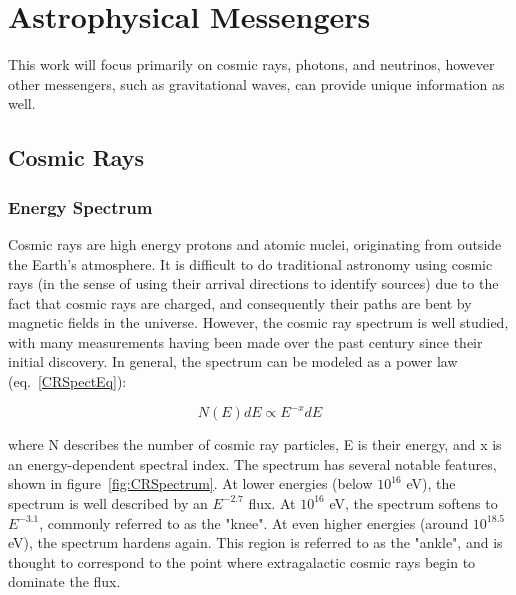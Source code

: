 \chapter{Astrophysical Messengers}\label{chapter:astromessengers}
This work will focus primarily on cosmic rays, photons, and neutrinos, however other messengers, such as gravitational waves, can provide unique information as well. 

\section{Cosmic Rays}
\subsection{Energy Spectrum}
Cosmic rays are high energy protons and atomic nuclei, originating from outside the Earth's atmosphere. It is difficult to do traditional astronomy  using cosmic rays (in the sense of using their arrival directions to identify sources) due to the fact that cosmic rays are charged, and consequently their paths are bent by magnetic fields in the universe. However, the cosmic ray spectrum is well studied, with many measurements having been made over the past century since their initial discovery. In general, the spectrum can be modeled as a power law (eq.~\ref{CRSpectEq}):

\begin{equation}
    N(E)dE \propto E^{-x}dE
\label{CRSpectEq}
\end{equation}

where N describes the number of cosmic ray particles, E is their energy, and x is an energy-dependent spectral index. The spectrum has several notable features, shown in figure~\ref{fig:CRSpectrum}. At lower energies (below $10^16$ eV), the spectrum is well described by an $E^{-2.7}$ flux. At $10^16$ eV, the spectrum softens to $E^{-3.1}$, commonly referred to as the "knee". At even higher energies (around $10^18.5$ eV), the spectrum hardens again. This region is referred to as the "ankle", and is thought to correspond to the point where extragalactic cosmic rays begin to dominate the flux. 

